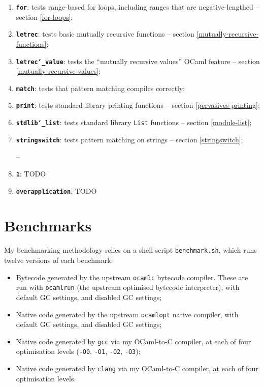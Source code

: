 \documentclass[12pt,a4paper,twoside,openright]{report}
\begin{document}
\begin{enumerate}
    \item \textbf{\texttt{for}}: tests range-based for loops, including ranges
        that are negative-lengthed -- section \ref{for-loops};
    \item \textbf{\texttt{letrec}}: tests basic mutually recursive functions --
        section \ref{mutually-recursive-functions};
    \item \textbf{\texttt{letrec\char`_value}}: tests the ``mutually recursive
        values'' OCaml feature -- section \ref{mutually-recursive-values};
    \item \textbf{\texttt{match}}: tests that pattern matching compiles
        correctly;
    \item \textbf{\texttt{print}}: tests standard library printing functions --
        section \ref{pervasives-printing};
    \item \textbf{\texttt{stdlib\char`_list}}: tests standard library
        \lstinline!List! functions -- section \ref{module-list};
    \item \textbf{\texttt{stringswitch}}: tests pattern matching on strings --
        section \ref{stringswitch};

--

    \item \textbf{\texttt{1}}: TODO
    \item \textbf{\texttt{overapplication}}: TODO
\end{enumerate}

\section{Benchmarks}

My benchmarking methodology relies on a shell script \lstinline!benchmark.sh!,
which runs twelve versions of each benchmark:
\begin{itemize}
    \item Bytecode generated by the upstream \lstinline!ocamlc! bytecode compiler. These are run with \lstinline!ocamlrun! (the upstream optimised bytecode interpreter), with default GC settings, and disabled GC settings;
    \item Native code generated by the upstream \lstinline!ocamlopt! native compiler, with default GC settings, and disabled GC settings;
    \item Native code generated by \lstinline!gcc! via my OCaml-to-C compiler, at each of four optimisation levels (\lstinline!-O0!, \lstinline!-O1!, \lstinline!-O2!, \lstinline!-O3!);
    \item Native code generated by \lstinline!clang! via my OCaml-to-C compiler, at each of four optimisation levels.
\end{itemize}
\end{document}
